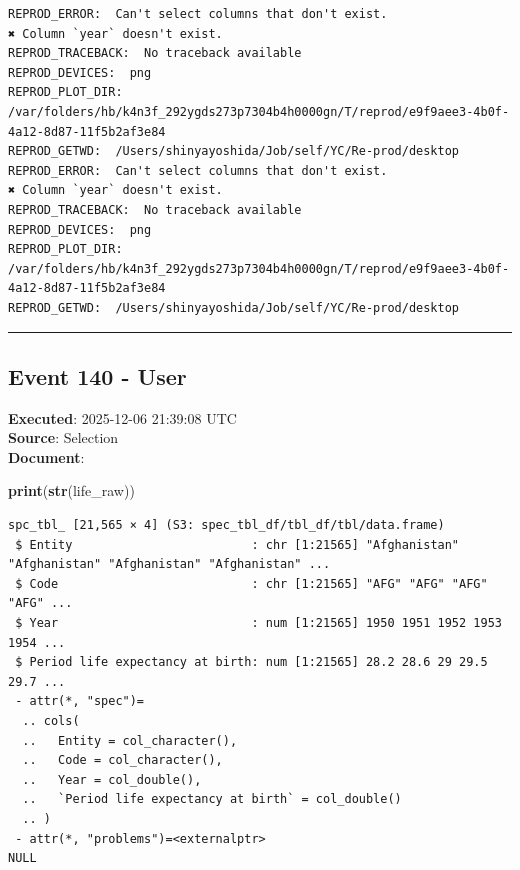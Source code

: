 \documentclass[
  11pt,
]{article}
\newenvironment{Shaded}{\begin{snugshade}}{\end{snugshade}}
\newcommand{\FunctionTok}[1]{\textcolor[rgb]{0.13,0.29,0.53}{\textbf{#1}}}
\newcommand{\NormalTok}[1]{#1}
\newenvironment{rpoutput}{\vspace{0.5em}\begin{snugshade}}{\end{snugshade}}
\begin{document}
\begin{rpoutput}

\begin{verbatim}
REPROD_ERROR:  Can't select columns that don't exist.
✖ Column `year` doesn't exist. 
REPROD_TRACEBACK:  No traceback available  
REPROD_DEVICES:  png 
REPROD_PLOT_DIR:  /var/folders/hb/k4n3f_292ygds273p7304b4h0000gn/T/reprod/e9f9aee3-4b0f-4a12-8d87-11f5b2af3e84 
REPROD_GETWD:  /Users/shinyayoshida/Job/self/YC/Re-prod/desktop 
REPROD_ERROR:  Can't select columns that don't exist.
✖ Column `year` doesn't exist. 
REPROD_TRACEBACK:  No traceback available  
REPROD_DEVICES:  png 
REPROD_PLOT_DIR:  /var/folders/hb/k4n3f_292ygds273p7304b4h0000gn/T/reprod/e9f9aee3-4b0f-4a12-8d87-11f5b2af3e84 
REPROD_GETWD:  /Users/shinyayoshida/Job/self/YC/Re-prod/desktop 
\end{verbatim}

\end{rpoutput}

\begin{center}\rule{0.5\linewidth}{0.5pt}\end{center}

\subsection{Event 140 - User}\label{event-140---user}

\textbf{Executed}: 2025-12-06 21:39:08 UTC\\
\textbf{Source}: Selection\\
\textbf{Document}:

\begin{Shaded}
\begin{Highlighting}[]
\FunctionTok{print}\NormalTok{(}\FunctionTok{str}\NormalTok{(life\_raw))}
\end{Highlighting}
\end{Shaded}

\begin{rpoutput}

\begin{verbatim}
spc_tbl_ [21,565 × 4] (S3: spec_tbl_df/tbl_df/tbl/data.frame)
 $ Entity                         : chr [1:21565] "Afghanistan" "Afghanistan" "Afghanistan" "Afghanistan" ...
 $ Code                           : chr [1:21565] "AFG" "AFG" "AFG" "AFG" ...
 $ Year                           : num [1:21565] 1950 1951 1952 1953 1954 ...
 $ Period life expectancy at birth: num [1:21565] 28.2 28.6 29 29.5 29.7 ...
 - attr(*, "spec")=
  .. cols(
  ..   Entity = col_character(),
  ..   Code = col_character(),
  ..   Year = col_double(),
  ..   `Period life expectancy at birth` = col_double()
  .. )
 - attr(*, "problems")=<externalptr> 
NULL
\end{verbatim}

\end{rpoutput}
\end{document}
